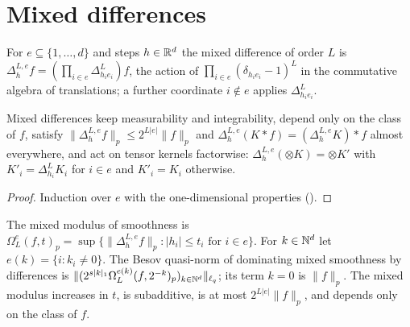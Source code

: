 \section{Mixed differences}

\begin{definition}
\label{def:mixed-differences}
\leanok
{}
For $e \subseteq \{1, \dots, d\}$ and steps $h \in \mathbb{R}^d$ the mixed difference of order $L$ is
$\Delta^{L,e}_h f = (\prod_{i \in e} \Delta^L_{h_i e_i}) f$, the action of
$\prod_{i \in e} (\delta_{h_i e_i} - 1)^L$ in the commutative algebra of translations; a further
coordinate $i \notin e$ applies $\Delta^L_{h_i e_i}$.
\end{definition}

\begin{lemma}
\label{lem:mixed-differences}
\leanok
{}
Mixed differences keep measurability and integrability, depend only on the class of $f$, satisfy
$\|\Delta^{L,e}_h f\|_p \leq 2^{L|e|} \|f\|_p$ and
$\Delta^{L,e}_h (K * f) = (\Delta^{L,e}_h K) * f$ almost everywhere, and act on tensor kernels
factorwise: $\Delta^{L,e}_h (\otimes K) = \otimes K'$ with $K'_i = \Delta^L_{h_i} K_i$ for
$i \in e$ and $K'_i = K_i$ otherwise.
\end{lemma}

\begin{proof}
\leanok
Induction over $e$ with the one-dimensional properties ().
\end{proof}

\begin{definition}
\label{def:mixed-moduli}
\leanok
{}
The mixed modulus of smoothness is
$\Omega^e_L(f, t)_p = \sup \{\|\Delta^{L,e}_h f\|_p : |h_i| \leq t_i \text{ for } i \in e\}$. For
$k \in \mathbb{N}^d$ let $e(k) = \{i : k_i \neq 0\}$. The Besov quasi-norm of dominating mixed smoothness
by differences is $\|(2^{s|k|_1} \Omega^{e(k)}_L(f, 2^{-k})_p)_{k \in \mathbb{N}^d}\|_{\ell_q}$; its term
$k = 0$ is $\|f\|_p$. The mixed modulus increases in $t$, is subadditive, is at most
$2^{L|e|} \|f\|_p$, and depends only on the class of $f$.
\end{definition}

